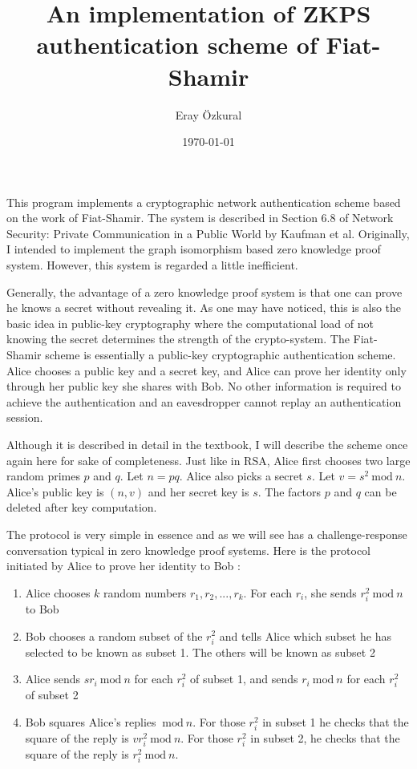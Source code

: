 \documentclass[a4paper,12pt]{article}
\title{An implementation of ZKPS authentication scheme of Fiat-Shamir }
\author{Eray \"Ozkural}
\date{\today}
\begin{document}
\maketitle

This program implements a cryptographic network authentication scheme
based on the work of Fiat-Shamir. The system is described in Section
6.8 of Network Security: Private Communication in a Public World by
Kaufman et al. Originally, I intended to implement the graph
isomorphism based zero knowledge proof system. However, this system is
regarded a little inefficient.

Generally, the advantage of a zero knowledge proof system is that one
can prove he knows a secret without revealing it. As one may have
noticed, this is also the basic idea in public-key cryptography where
the computational load of not knowing the secret determines the
strength of the crypto-system. The Fiat-Shamir scheme is essentially a
public-key cryptographic authentication scheme. Alice chooses a public
key and a secret key, and Alice can prove her identity only through
her public key she shares with Bob. No other information is required
to achieve the authentication and an eavesdropper cannot replay an
authentication session.

Although it is described in detail in the textbook, I will describe
the scheme once again here for sake of completeness. Just like in RSA,
Alice first chooses two large random primes $p$ and $q$. Let $n=pq$.
Alice also picks a secret $s$. Let $v=s^2\ \text{mod}\ n$. Alice's public key
is $(n,v)$ and her secret key is $s$. The factors $p$ and $q$ can be
deleted after key computation.

The protocol is very simple in essence and as we will see has a
challenge-response conversation typical in zero knowledge proof
systems. Here is the protocol initiated by Alice to prove her identity to Bob
:

\begin{enumerate}
\item Alice chooses $k$ random numbers $r_1,r_2,...,r_k$. For each
$r_i$, she sends $r_i^2 \ \text{mod}\  n$ to Bob

\item Bob chooses a random subset of the $r_i^2$ and tells Alice
  which subset he has selected to be known as subset 1. The
  others will be known as subset 2

\item Alice sends $sr_i\  \text{mod}\  n$ for each $r_i^2$ of subset 1, and
  sends $r_i\  \text{mod}\  n$ for each $r_i^2$ of subset 2
\item Bob squares Alice's replies $\ \text{mod}\  n$. For those $r_i^2$ in
  subset 1 he checks that the square of the reply is $vr_i^2
  \ \text{mod}\  n$. For those $r_i^2$ in subset 2, he checks that the
  square of the reply is $ r_i^2\  \text{mod}\  n$.

\end{enumerate}
\end{document}
